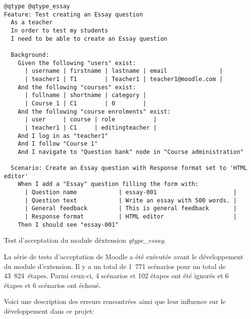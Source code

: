 \begin{lstfloat}
\begin{lstlisting}[frame=l]
@qtype @qtype_essay
Feature: Test creating an Essay question
  As a teacher
  In order to test my students
  I need to be able to create an Essay question

  Background:
    Given the following "users" exist:
      | username | firstname | lastname | email               |
      | teacher1 | T1        | Teacher1 | teacher1@moodle.com |
    And the following "courses" exist:
      | fullname | shortname | category |
      | Course 1 | C1        | 0        |
    And the following "course enrolments" exist:
      | user     | course | role           |
      | teacher1 | C1     | editingteacher |
    And I log in as "teacher1"
    And I follow "Course 1"
    And I navigate to "Question bank" node in "Course administration"

  Scenario: Create an Essay question with Response format set to 'HTML editor'
    When I add a "Essay" question filling the form with:
      | Question name            | essay-001                      |
      | Question text            | Write an essay with 500 words. |
      | General feedback         | This is general feedback       |
      | Response format          | HTML editor                    |
    Then I should see "essay-001"
\end{lstlisting}
\caption{Test d'acceptation du module d\'extension \textit{qtype\_essay}.}
\label{code:behattest}
\end{lstfloat}

La série de tests d'acceptation de Moodle a été exécutée avant le développement du module d'extension.
Il y a un total de 1~771 scénarios pour un total de 43~824~étapes.
Parmi ceux-ci, 4 scénarios et 102 étapes ont été ignorés et 6 étapes et 6 scénarios ont échoué.

Voici une description des erreurs rencontr\'ees ainsi que leur influence sur le développement dans ce projet:

